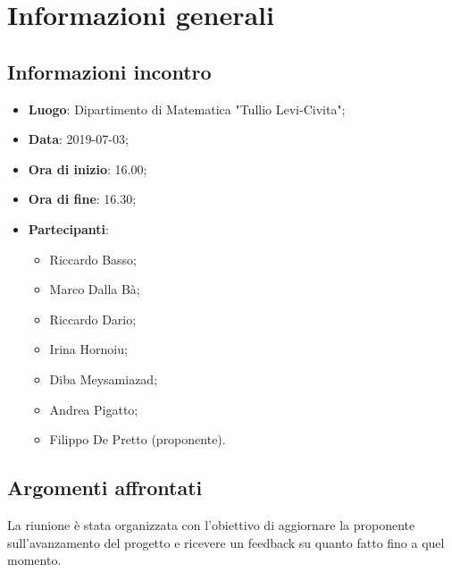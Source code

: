 \section{Informazioni generali}

\subsection{Informazioni incontro}
\begin{itemize}
	\item \textbf{Luogo}: Dipartimento di Matematica "Tullio Levi-Civita";
	\item \textbf{Data}: 2019-07-03;
	\item \textbf{Ora di inizio}: 16.00;
	\item \textbf{Ora di fine}: 16.30;
	\item \textbf{Partecipanti}: 
	\begin{itemize}
		\item Riccardo Basso;
		\item Marco Dalla Bà;
		\item Riccardo Dario;
		\item Irina Hornoiu;
		\item Diba Meysamiazad;
		\item Andrea Pigatto;
		\item Filippo De Pretto (proponente).	
	\end{itemize}
\end{itemize}

\subsection{Argomenti affrontati}
La riunione è stata organizzata con l'obiettivo di aggiornare la proponente sull'avanzamento del progetto e ricevere un feedback su quanto fatto fino a quel momento.